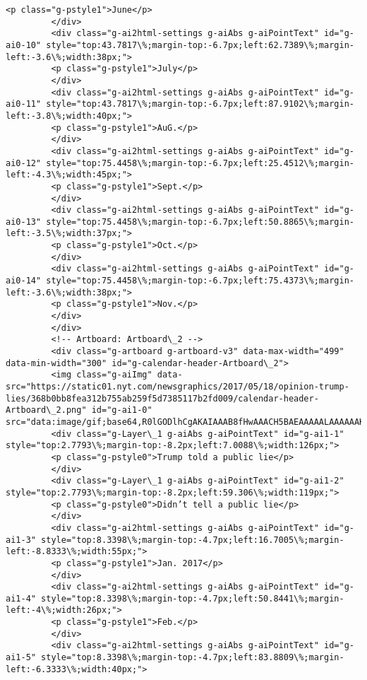 \documentclass[11pt]{article}
\begin{document}
\begin{Verbatim}[commandchars=\\\{\}]
         <p class="g-pstyle1">June</p>
         </div>
         <div class="g-ai2html-settings g-aiAbs g-aiPointText" id="g-ai0-10" style="top:43.7817\%;margin-top:-6.7px;left:62.7389\%;margin-left:-3.6\%;width:38px;">
         <p class="g-pstyle1">July</p>
         </div>
         <div class="g-ai2html-settings g-aiAbs g-aiPointText" id="g-ai0-11" style="top:43.7817\%;margin-top:-6.7px;left:87.9102\%;margin-left:-3.8\%;width:40px;">
         <p class="g-pstyle1">AuG.</p>
         </div>
         <div class="g-ai2html-settings g-aiAbs g-aiPointText" id="g-ai0-12" style="top:75.4458\%;margin-top:-6.7px;left:25.4512\%;margin-left:-4.3\%;width:45px;">
         <p class="g-pstyle1">Sept.</p>
         </div>
         <div class="g-ai2html-settings g-aiAbs g-aiPointText" id="g-ai0-13" style="top:75.4458\%;margin-top:-6.7px;left:50.8865\%;margin-left:-3.5\%;width:37px;">
         <p class="g-pstyle1">Oct.</p>
         </div>
         <div class="g-ai2html-settings g-aiAbs g-aiPointText" id="g-ai0-14" style="top:75.4458\%;margin-top:-6.7px;left:75.4373\%;margin-left:-3.6\%;width:38px;">
         <p class="g-pstyle1">Nov.</p>
         </div>
         </div>
         <!-- Artboard: Artboard\_2 -->
         <div class="g-artboard g-artboard-v3" data-max-width="499" data-min-width="300" id="g-calendar-header-Artboard\_2">
         <img class="g-aiImg" data-src="https://static01.nyt.com/newsgraphics/2017/05/18/opinion-trump-lies/368b0bb8fea312b755ab259f5d7385117b2fd009/calendar-header-Artboard\_2.png" id="g-ai1-0" src="data:image/gif;base64,R0lGODlhCgAKAIAAAB8fHwAAACH5BAEAAAAALAAAAAAKAAoAAAIIhI+py+0PYysAOw=="/>
         <div class="g-Layer\_1 g-aiAbs g-aiPointText" id="g-ai1-1" style="top:2.7793\%;margin-top:-8.2px;left:7.0088\%;width:126px;">
         <p class="g-pstyle0">Trump told a public lie</p>
         </div>
         <div class="g-Layer\_1 g-aiAbs g-aiPointText" id="g-ai1-2" style="top:2.7793\%;margin-top:-8.2px;left:59.306\%;width:119px;">
         <p class="g-pstyle0">Didn’t tell a public lie</p>
         </div>
         <div class="g-ai2html-settings g-aiAbs g-aiPointText" id="g-ai1-3" style="top:8.3398\%;margin-top:-4.7px;left:16.7005\%;margin-left:-8.8333\%;width:55px;">
         <p class="g-pstyle1">Jan. 2017</p>
         </div>
         <div class="g-ai2html-settings g-aiAbs g-aiPointText" id="g-ai1-4" style="top:8.3398\%;margin-top:-4.7px;left:50.8441\%;margin-left:-4\%;width:26px;">
         <p class="g-pstyle1">Feb.</p>
         </div>
         <div class="g-ai2html-settings g-aiAbs g-aiPointText" id="g-ai1-5" style="top:8.3398\%;margin-top:-4.7px;left:83.8809\%;margin-left:-6.3333\%;width:40px;">

\end{Verbatim}
\end{document}
